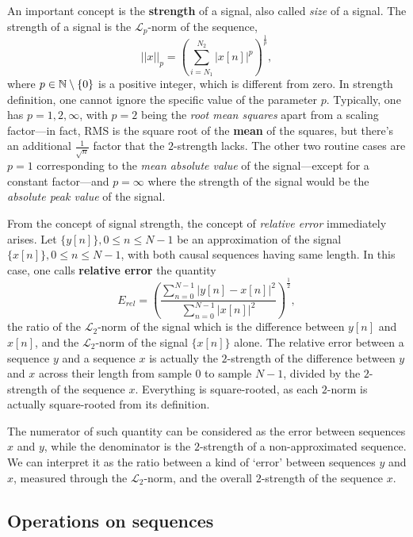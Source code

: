 \documentclass[\documentfontsize, twocolumn]{\classname}
\begin{document}
An important concept is the \textbf{strength} of a signal, also called \emph{size} of a signal. The strength of a signal is the $\mathcal{L}_p$-norm of the se\-quen\-ce,
\[
||x||_p = \left(\sum_{i=N_1}^{N_2} |x[n]|^p\right)^{\frac{1}{p}},
\]
where $p \in \mathbb N \setminus \{0\}$ is a positive integer, which is different from zero. In strength definition, one cannot ignore the specific value of the parameter $p$. Typically, one has $p=1,2,\infty$, with $p=2$ being the \emph{root mean squares} apart from a scaling factor---in fact, RMS is the square root of the \textbf{mean} of the squares, but there's an additional $\frac{1}{\sqrt{n}}$ factor that the $2$-strength lacks. The other two routine cases are $p=1$ corresponding to the \emph{mean absolute value} of the signal---except for a constant factor---and $p=\infty$ where the strength of the signal would be the \emph{absolute peak value} of the signal.

From the concept of signal strength, the concept of \emph{relative error} immediately arises. Let $\{y[n]\}, 0 \leq n \leq N - 1$ be an approximation of the signal $\{x[n]\}, 0 \leq n \leq N - 1$, with both causal sequences having same length. In this case, one calls \textbf{relative error} the quantity
\begin{equation}\label{eqn:RelativeError}
	E_{rel} = \left(\frac{\sum_{n=0}^{N-1} |y[n] - x[n]|^2}{\sum_{n=0}^{N-1} |x[n]|^2}\right)^\frac{1}{2},
\end{equation}
the ratio of the $\mathcal L_2$-norm of the signal which is the difference between $y[n]$ and $x[n]$, and the $\mathcal L_2$-norm of the signal $\{x[n]\}$ alone. The relative error between a sequence $y$ and a sequence $x$ is actually the $2$-strength of the difference between $y$ and $x$ across their length from sample $0$ to sample $N-1$, divided by the $2$-strength of the sequence $x$. Everything is square-rooted, as each $2$-norm is actually square-rooted from its definition.

The numerator of such quantity can be considered as the error between se\-quen\-ces $x$ and $y$, while the denominator is the $2$-strength of a non-approximated se\-quen\-ce. We can interpret it as the ratio between a kind of `error' between sequences $y$ and $x$, measured through the $\mathcal L_2$-norm, and the overall $2$-strength of the sequence $x$.

\subsection{Operations on se\-quen\-ces}\label{sec:operationsOnSequences}
\end{document}

